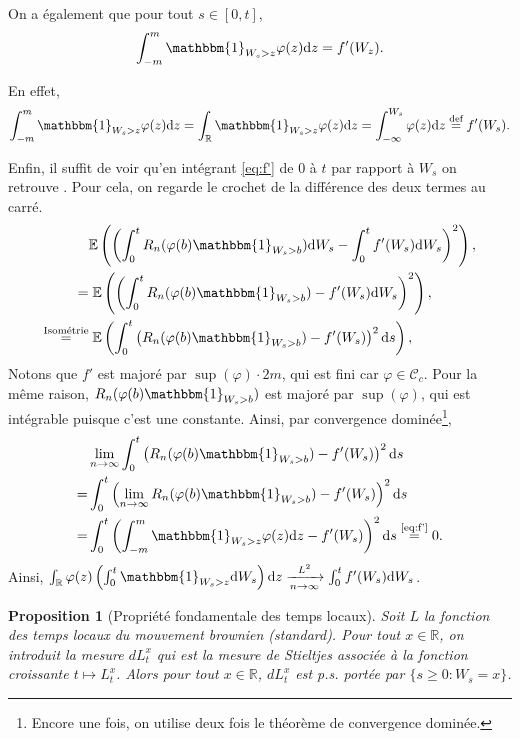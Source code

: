 \documentclass[openany]{book}
\makeatletter
\newcommand{\R}{\mathbb{R}}
\newcommand{\E}{\mathbb{E}}
\newcommand{\1}{\mathbbm{1}}
\renewcommand{\d}{\mathrm{d}}
\renewenvironment{proof}[1][\textbf{\textit{Démonstration}}]{%
  \par\pushQED{\qed}%
  \normalfont\topsep6\p@\@plus6\p@\relax
  \trivlist\item[\hskip\labelsep
    #1\@addpunct{.}]\ignorespaces
}{%
  \popQED\endtrivlist\@endpefalse
}
\theoremstyle{thmfont}
\theoremstyle{deffont}
\theoremstyle{thmfont}
\newtheorem{prop}[prop]{Proposition}
\theoremstyle{deffont}
\makeatother
\begin{document}
\begin{proof}
  \noindent On a également que pour tout $s \in [0,t]$, 
  \begin{equation}
    \int_{-m}^m \1_{W_s > z}  \varphi(z)\d z = f'(W_z). \label{eq:f'}
  \end{equation}

  \noindent En effet,
  \begin{equation*}
    \int_{-m}^m \1_{W_s > z}  \varphi(z)\d z = \int_\R \1_{W_s > z}  \varphi(z)\d z = \int_{-\infty}^{W_s} \varphi(z) \d z \overset{\text{def}}{=} f'(W_s). 
  \end{equation*}

  Enfin, il suffit de voir qu'en intégrant \eqref{eq:f'} de $0$ à $t$  par rapport à $W_s$ on retrouve . Pour cela, on regarde le crochet de la différence des deux termes au carré.
  \begin{align*}
    & \E\left(\left( \int_0^t R_n(\varphi(b) \1_{W_s>b}) \d W_s - \int_0^t f'(W_s) \d W_s\right)^2\right),\\
    =&  \;\E\left(\left( \int_0^t R_n(\varphi(b) \1_{W_s>b}) - f'(W_s) \d W_s\right)^2\right),\\
    \overset{\text{Isométrie}}{=}& \;\E\left( \int_0^t \left(R_n(\varphi(b) \1_{W_s>b}) - f'(W_s) \right)^2\d s\right),
  \end{align*}
  Notons que $f'$ est majoré par $\sup(\varphi)\cdot 2m$, qui est fini car $\varphi \in \mathcal C_c$. Pour la même raison, $R_n(\varphi(b) \1_{W_s>b})$ est majoré par $\sup(\varphi)$, qui est intégrable puisque c'est une constante. Ainsi, par convergence dominée\footnote{Encore une fois, on utilise deux fois le théorème de convergence dominée.},
  \begin{align*}
     & \lim_{n \to \infty}\int_0^t \left(R_n(\varphi(b) \1_{W_s>b}) - f'(W_s) \right)^2\d s\\
    =&  \int_0^t \left(\lim_{n \to \infty}R_n(\varphi(b) \1_{W_s>b}) - f'(W_s) \right)^2\d s\\
    =&  \int_0^t  \left( \int_{-m}^m \1_{W_s > z}  \varphi(z)\d z - f'(W_s) \right)^2\d s \overset{\text{\eqref{eq:f'}}}{=} 0.
  \end{align*}
  Ainsi, $\int_\R \varphi(z)\left( \int_0^t \1_{W_s>z} \d W_s \right) \d z\xrightarrow[n \to \infty]{L^2} \int_0^t f'(W_s) \d W_s$.
\end{proof}

\begin{prop}[Propriété fondamentale des temps locaux]
Soit $L$ la fonction des temps locaux du mouvement brownien (standard). Pour tout $x \in \R$, on introduit la mesure $dL^x_t$ qui est la mesure de Stieltjes associée à la fonction croissante $t \mapsto L_t^x$. Alors pour tout $x\in \R$, $dL^x_t$ est p.s. portée par $\{s \geq 0 : W_s = x\}$.
\end{prop}
\end{document}
